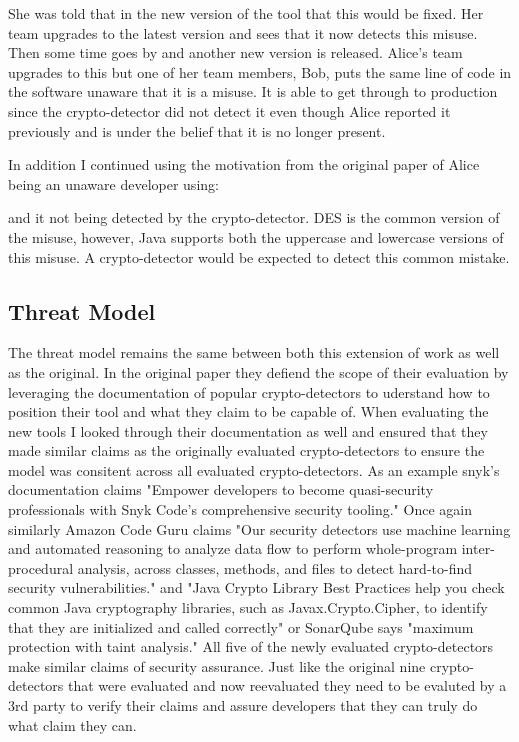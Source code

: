 
She was told that in the new version of the tool that this would be fixed. Her team upgrades to the latest version and sees that it now detects this misuse. Then some time goes by and another new version is released. Alice's team upgrades to this but one of her team members, Bob, puts the same line of code in the software unaware that it is a misuse. It is able to get through to production since the crypto-detector did not detect it even though Alice reported it previously and is under the belief that it is no longer present.

In addition I continued using the motivation from the original paper of Alice being an unaware developer using:


and it not being detected by the crypto-detector. DES is the common version of the misuse, however, Java supports both the uppercase and lowercase versions of this misuse. A crypto-detector would be expected to detect this common mistake.

\subsection{Threat Model}
\label{ch1:subsec:ThreatModel}

The threat model remains the same between both this extension of work as well as the original. In the original paper they defiend the scope of their evaluation by leveraging the documentation of popular crypto-detectors to uderstand how to position their tool and what they claim to be capable of. When evaluating the new tools I looked through their documentation as well and ensured that they made similar claims as the originally evaluated crypto-detectors to ensure the model was consitent across all evaluated crypto-detectors. As an example snyk's documentation claims "Empower developers to become quasi-security professionals with Snyk Code’s comprehensive security tooling." \cite{snyk} Once again similarly Amazon Code Guru claims "Our security detectors use machine learning and automated reasoning to analyze data flow to perform whole-program inter-procedural analysis, across classes, methods, and files to detect hard-to-find security vulnerabilities." \cite{codeguru} and "Java Crypto Library Best Practices help you check common Java cryptography libraries, such as Javax.Crypto.Cipher, to identify that they are initialized and called correctly" or SonarQube says "maximum protection with taint analysis." \cite{sonarqube} All five of the newly evaluated crypto-detectors make similar claims of security assurance. Just like the original nine crypto-detectors that were evaluated and now reevaluated they need to be evaluted by a 3rd party to verify their claims and assure developers that they can truly do what claim they can.

